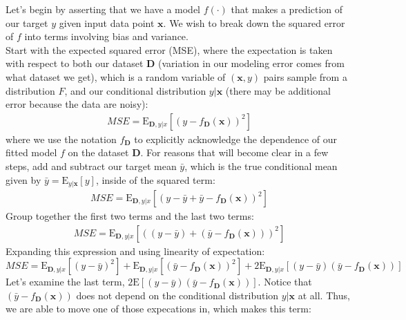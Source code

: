 \begin{derivation}
    Let's begin by asserting that we have a model $f(\cdot)$ that makes a prediction of our target $y$ given input data point $\mathbf{x}$. We wish to break down the squared error of $f$ into terms involving bias and variance. \\

    Start with the expected squared error (MSE), where the expectation is taken with respect to both our dataset $\mathbf{D}$ (variation in our modeling error comes from what dataset we get), which is a random variable of $(\mathbf{x}, y)$ pairs sample from a distribution $F$, and our conditional distribution $y | \mathbf{x}$ (there may be additional error because the data are noisy):
    \begin{align*}
        \textit{MSE} = \mathrm{E}_{\mathbf{D},y|x}[(y - f_\mathbf{D}(\mathbf{x}))^{2}]
    \end{align*}
    where we use the notation $f_\mathbf{D}$ to explicitly acknowledge the dependence of our fitted model $f$ on the dataset $\mathbf{D}$.  For reasons that will become clear in a few steps, add and subtract our target mean $\bar{y}$, which is the true conditional mean given by $\bar{y} = \mathrm{E}_{y|\mathbf{x}}[y]$, inside of the squared term:
    \begin{align*}
        \textit{MSE} = \mathrm{E}_{\mathbf{D},y|x}[(y - \bar{y} + \bar{y} - f_\mathbf{D}(\mathbf{x}))^{2}]
    \end{align*}
    Group together the first two terms and the last two terms:
    \begin{align*}
        \textit{MSE} = \mathrm{E}_{\mathbf{D},y|x}[((y - \bar{y}) + (\bar{y} - f_\mathbf{D}(\mathbf{x})))^{2}]
    \end{align*}
    Expanding this expression and using linearity of expectation:
    \begin{equation} \label{bias-variance-intermediate-1}
        \textit{MSE} = \mathrm{E}_{\mathbf{D},y|x}[(y - \bar{y})^{2}] + \mathrm{E}_{\mathbf{D},y|x}[(\bar{y} - f_\mathbf{D}(\mathbf{x}))^{2}] + 2\mathrm{E}_{\mathbf{D},y|x}[(y - \bar{y})(\bar{y} - f_\mathbf{D}(\mathbf{x}))]
    \end{equation}
    Let's examine the last term, $2\mathrm{E}[(y - \bar{y})(\bar{y} - f_\mathbf{D}(\mathbf{x}))]$. Notice that $(\bar{y} - f_\mathbf{D}(\mathbf{x}))$ does not depend on the conditional distribution $y|\mathbf{x}$ at all. Thus, we are able to move one of those expecations in, which makes this term:
    \begin{align*}

\end{align*}
\end{derivation}
